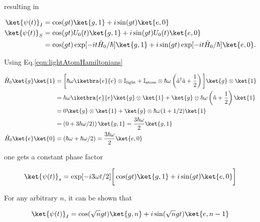 \noindent resulting in 

\begin{equation}
\begin{aligned}
\ket{\psi(t)}_I & = \cos(gt)\ket{g,1}+i\sin(gt)\ket{e,0}\\
\ket{\psi(t)}_S & = \cos(gt)U_0(t)\ket{g,1}+i\sin(gt)U_0(t)\ket{e,0}\\
& = \cos(gt)\exp[-it \hat{H}_0/\hbar]\ket{g,1}+i\sin(gt)\exp[-it \hat{H}_0/\hbar]\ket{e,0}.
\end{aligned}
\end{equation}

\noindent Using Eq.\eqref{eqn:lightAtomHamiltonians}

\begin{equation}
\begin{aligned}
\hat{H}_0\ket{g}\ket{1} & = \bigg[\hbar\omega\iketbra{e}{e}\otimes\mathbb{I}_\text{light} + \mathbb{I}_\text{atom}\otimes \hbar\omega\left(\hat{a}^\dagger\hat{a}+\frac{1}{2}\right)\bigg]\ket{g}\otimes\ket{1}  \\
& = \hbar\omega\iketbra{e}{e}\ket{g} \otimes \ket{1} + \ket{g}\otimes \hbar\omega\left(\hat{n}+\frac{1}{2}\right)\ket{1}\\
& = 0  \ket{g} \otimes\ket{1} + \ket{g} \otimes \hbar\omega(1+1/2)\ket{1}\\
& = \left(0+3\hbar\omega/2)\right)\ket{g,1} = \frac{3\hbar\omega}{2}\ket{g,1}\\
\hat{H}_0\ket{e}\ket{0} & = (\hbar\omega + \hbar\omega/2) = \frac{3\hbar\omega}{2}\ket{e,0}
\end{aligned}
\end{equation}

\noindent one gets a constant phase factor

\textcolor{red}{\begin{equation}
	\ket{\psi(t)}_s = \exp[-i3\omega t/2]\bigg[\cos(gt)\ket{g,1}+i\sin(gt)\ket{e,0}\bigg]
	\end{equation}}

\noindent For any arbitrary $n$, it can be shown that

\textcolor{red}{\begin{equation}
	\ket{\psi(t)}_I = \cos(\sqrt{n}gt)\ket{g,n}+i\sin(\sqrt{n}gt)\ket{e,n-1}
	\end{equation}}  

\newpage
